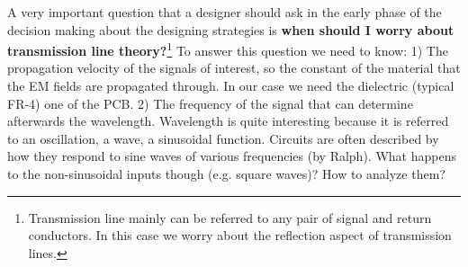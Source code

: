 \documentclass[12pt]{article}
\begin{document}
A very important question that a designer should ask in the early phase of the decision making about the designing strategies is \textbf{when should I worry about transmission line theory?}\footnote{Transmission line mainly can be referred to any pair of signal and return conductors. In this case we worry about the reflection aspect of transmission lines.} To answer this question we need to know: 1) The propagation velocity of the signals of interest, so the constant of the material that the EM fields are propagated through. In our case we need the dielectric (typical FR-4) one of the PCB. 2) The frequency of the signal that can determine afterwards the wavelength. Wavelength is quite interesting because it is referred to an oscillation, a wave, a sinusoidal function. Circuits are often described by how they respond to sine waves of various frequencies (by Ralph). What happens to the non-sinusoidal inputs though (e.g. square waves)? How to analyze them? 





\end{document}
